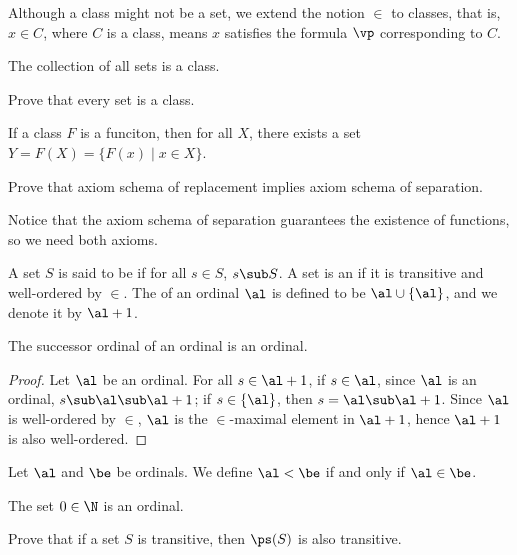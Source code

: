 \documentclass[10pt]{article}
\begin{document}
\begin{remark}
    Although a class might not be a set, we extend the notion $\in$ to classes, that is, $x\in C$, where $C$ is a class, means $x$ satisfies the formula $\vp$ corresponding to $C$.
\end{remark}
\begin{example}
    The collection of all sets is a class.
\end{example}
\begin{problem}
    Prove that every set is a class.
\end{problem}
\begin{Axiom schema of replacement}
    If a class $F$ is a funciton, then for all $X$, there exists a set $Y=F(X)=\{F(x)\mid x\in X\}$.
\end{Axiom schema of replacement}
\begin{problem}
    Prove that axiom schema of replacement implies axiom schema of separation.
\end{problem}
\par
Notice that the axiom schema of separation guarantees the existence of functions, so we need both axioms.
\begin{definition}
    A set $S$ is said to be  if for all $s\in S$, $s\sub S$. A set is an  if it is transitive and well-ordered by $\in$. The  of an ordinal $\al$ is defined to be $\al\cup\{\al\}$, and we denote it by $\al+1$. 
\end{definition}
\begin{proposition}
    The successor ordinal of an ordinal is an ordinal.
\end{proposition}
\begin{proof}
    Let $\al$ be an ordinal. For all $s\in\al+1$, if $s\in\al$, since $\al$ is an ordinal, $s\sub\al\sub\al+1$; if $s\in\{\al\}$, then $s=\al\sub\al+1$. Since $\al$ is well-ordered by $\in$, $\al$ is the $\in$-maximal element in $\al+1$, hence $\al+1$ is also well-ordered.
\end{proof}
\par
Let $\al$ and $\be$ be ordinals. We define $\al<\be$ if and only if $\al\in\be$.
\begin{example}
    The set $0\in\N$ is an ordinal.
\end{example}
\begin{problem}
    Prove that if a set $S$ is transitive, then $\ps(S)$ is also transitive.
\end{problem}
\end{document}
